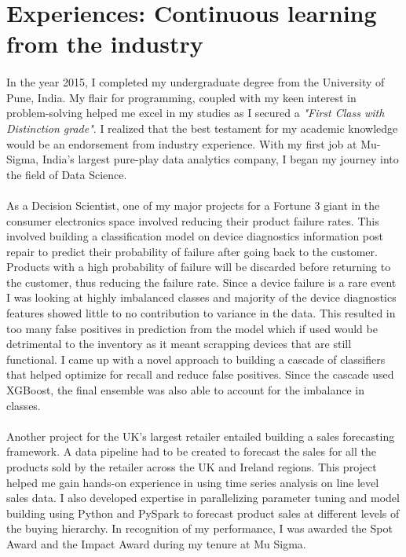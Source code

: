 \documentclass[letterpaper]{article}
\begin{document}
\section*{Experiences: Continuous learning from the industry}
\paragraph{}
In the year 2015, I completed my undergraduate degree from the University of Pune, India. My flair for programming, coupled with my keen interest in problem-solving helped me excel in my studies as I secured a {\it "First Class with Distinction grade"}. I realized that the best testament for my academic knowledge would be an endorsement from industry experience. With my first job at Mu-Sigma, India’s largest pure-play data analytics company, I began my journey into the field of Data Science. 

\paragraph{}
As a Decision Scientist,  one of my major projects for a Fortune 3 giant in the consumer electronics space involved reducing their product failure rates. This involved building a classification model on device diagnostics information post repair to predict their probability of failure after going back to the customer. Products with a high probability of failure will be discarded before returning to the customer, thus reducing the failure rate. Since a device failure is a rare event I was looking at highly imbalanced classes and majority of the device diagnostics features showed little to no contribution to variance in the data. This resulted in too many false positives in prediction from the model which if used would be detrimental to the inventory as it meant scrapping devices that are still functional. I came up with a novel approach to building a cascade of classifiers that helped optimize for recall and reduce false positives. Since the cascade used XGBoost, the final ensemble was also able to account for the imbalance in classes.

\paragraph{}
Another project for the UK's largest retailer entailed building a sales forecasting framework. A
data pipeline had to be created to forecast the sales for all the products sold by the retailer across the
UK and Ireland regions. This project helped me gain hands-on experience in using time series analysis on
line level sales data. I also developed expertise in parallelizing parameter tuning and model building using Python and PySpark to forecast product sales at different levels of the buying hierarchy.
In recognition of my performance, I was awarded the Spot Award and the Impact Award during my
tenure at Mu Sigma.
\end{document}
